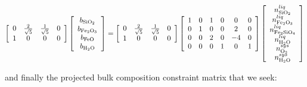 \documentclass[11pt, titlepage, twoside]{article}
\begin{document}
\begin{MPEquation}[!ht]
\begin{equation}
\left[ {\begin{array}{*{20}{c}}
0&{\frac{2}{{\sqrt 5 }}}&{\frac{1}{{\sqrt 5 }}}&0\\
1&0&0&0
\end{array}} \right]\left[ {\begin{array}{*{20}{c}}
{{b_{{\rm{Si}}{{\rm{O}}_{\rm{2}}}}}}\\
{{b_{{\rm{F}}{{\rm{e}}_{\rm{2}}}{{\rm{O}}_{\rm{3}}}}}}\\
{{b_{{\rm{FeO}}}}}\\
{{b_{{{\rm{H}}_{\rm{2}}}{\rm{O}}}}}
\end{array}} \right] = \left[ {\begin{array}{*{20}{c}}
0&{\frac{2}{{\sqrt 5 }}}&{\frac{1}{{\sqrt 5 }}}&0\\
1&0&0&0
\end{array}} \right]\left[ {\begin{array}{*{20}{c}}
1&0&1&0&0&0\\
0&1&0&0&2&0\\
0&0&2&0&{ - 4}&0\\
0&0&0&1&0&1
\end{array}} \right]\left[ {\begin{array}{*{20}{c}}
{n_{{\rm{Si}}{{\rm{O}}_2}}^{liq}}\\
{n_{{\rm{F}}{{\rm{e}}_2}{{\rm{O}}_3}}^{liq}}\\
{n_{{\rm{F}}{{\rm{e}}_2}{\rm{Si}}{{\rm{O}}_4}}^{liq}}\\
{n_{{{\rm{H}}_2}{\rm{O}}}^{liq}}\\
{n_{{{\rm{O}}_2}}^{sys}}\\
{n_{{{\rm{H}}_2}{\rm{O}}}^{sys}}
\end{array}} \right]
\end{equation}
\label{MPEquationElement:52A10275-C691-47CD-E265-E001C2263390}
\end{MPEquation}
and finally the projected bulk composition constraint matrix that we seek:
\end{document}

